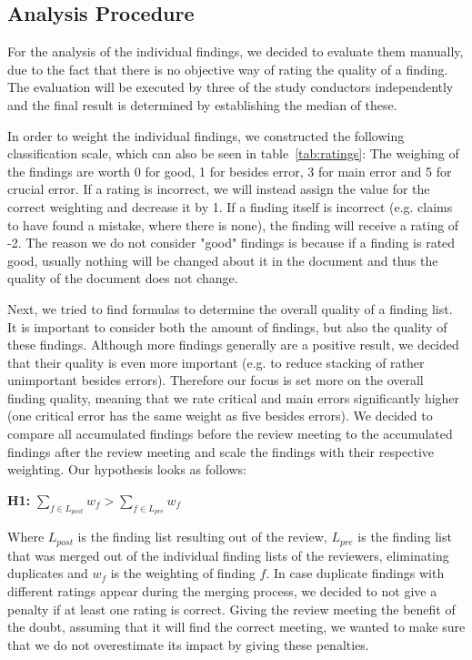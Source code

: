\subsection{Analysis Procedure}

For the analysis of the individual findings, we decided to evaluate them manually, due to the fact that there is no objective way of rating the quality of a finding. The evaluation will be executed by three of the study conductors independently and the final result is determined by establishing the median of these.

In order to weight the individual findings, we constructed the following classification scale, which can also be seen in table~\ref{tab:ratings}:
The weighing of the findings are worth 0 for good, 1 for besides error, 3 for main error and 5 for crucial error. If a rating is incorrect, we will instead assign the value for the correct weighting and decrease it by 1.
If a finding itself is incorrect (e.g. claims to have found a mistake, where there is none), the finding will receive a rating of -2.
The reason we do not consider "good" findings is because if a finding is rated good, usually nothing will be changed about it in the document and thus the quality of the document does not change.

Next, we tried to find formulas to determine the overall quality of a finding list. It is important to consider both the amount of findings, but also the quality of these findings. Although more findings generally are a positive result, we decided that their quality is even more important (e.g. to reduce stacking of rather unimportant besides errors). Therefore our focus is set more on the overall finding quality, meaning that we rate critical and main errors significantly higher (one critical error has the same weight as five besides errors).
We decided to compare all accumulated findings before the review meeting to the accumulated findings after the review meeting and scale the findings with their respective weighting.
Our hypothesis looks as follows:

\begin{center}
	\textbf{H1:} $\sum_{f \in L_{post}} w_f > \sum_{f \in L_{pre}} w_f$
\end{center}

Where $L_{post}$ is the finding list resulting out of the review, $L_{pre}$ is the finding list that was merged out of the individual finding lists of the reviewers, eliminating duplicates and $w_f$ is the weighting of finding $f$. 
In case duplicate findings with different ratings appear during the merging process, we decided to not give a penalty if at least one rating is correct. Giving the review meeting the benefit of the doubt, assuming that it will find the correct meeting, we wanted to make sure that we do not overestimate its impact by giving these penalties.

